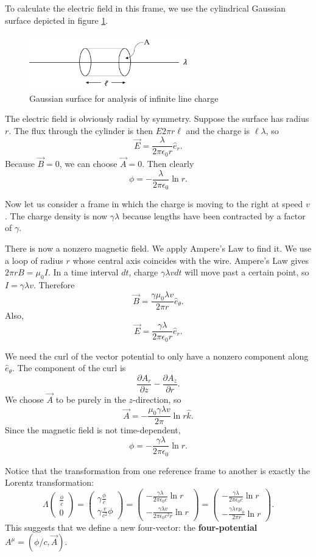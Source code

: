 To calculate the electric field in this frame, we use the cylindrical Gaussian surface depicted in figure \ref{1}.
\begin{figure}[ht]
\centering
\includegraphics[width=7cm]{images/relativity/surface.pdf}
\caption {Gaussian surface for analysis of infinite line charge}
 \label{1}
\end{figure} 
 The electric field is obviously radial by symmetry. Suppose the surface has radius $r$. The flux through the cylinder is then $E 2 \pi r \ell $ and the charge is $\ell \lambda$, so \[\vec{E} = \frac{\lambda}{2\pi\epsilon_0 r} \hat{e}_r. \]
Because $\vec{B} = 0$, we can choose $\vec{A} = 0$. Then clearly \[ \phi = -\frac{\lambda}{2\pi \epsilon_0} \ln r.\]

Now let us consider a frame in which the charge is moving to the right at speed $v$. The charge density is now $\gamma \lambda$ because lengths have been contracted by a factor of $\gamma$.

There is now a nonzero magnetic field. We apply Ampere's Law to find it. We use a loop of radius $r$ whose central axis coincides with the wire. Ampere's Law gives $2 \pi r B = \mu_0 I$. In a time interval $dt$, charge $\gamma \lambda v dt$ will move past a certain point, so $I = \gamma \lambda v$. Therefore \[\vec{B} = \frac{\gamma\mu_0\lambda v}{2\pi r} \hat{e}_\theta. \] 
Also, 
\[\vec{E} = \frac{\gamma \lambda}{2\pi\epsilon_0 r} \hat{e}_r. \]

We need the curl of the vector potential to only have a nonzero component along 
$\hat{e}_\theta$. The component of the curl is \[\frac{\partial A_r}{\partial z} - \frac{\partial A_z}{\partial r} .\] We choose $\vec{A}$ to be purely in the $z$-direction, so \[\vec{A} = -\frac{\mu_0 \gamma \lambda v}{2\pi} \ln r \hat{k} .\] Since the magnetic field is not time-dependent, 
\[\phi = -\frac{\gamma \lambda}{2\pi\epsilon_0} \ln r .\]

Notice that the transformation from one reference frame to another is exactly the Lorentz transformation:
\[
\Lambda \begin{pmatrix} \frac{\phi}{c} \\ 0 \end{pmatrix} = \begin{pmatrix}
\gamma \frac{\phi}{c} \\
\gamma \frac{v}{c^2} \phi 
\end{pmatrix} = \begin{pmatrix}
-\frac{\gamma \lambda}{2\pi\epsilon_0c} \ln r \\ -\frac{\gamma\lambda v}{2\pi \epsilon_0 c^2 r} \ln r
\end{pmatrix} = \begin{pmatrix}
-\frac{\gamma \lambda}{2\pi\epsilon_0c} \ln r \\ -\frac{\gamma\lambda v\mu_0}{2\pi  r} \ln r
\end{pmatrix}.
\]
This suggests that we define a new four-vector: the \textbf{four-potential} $A^\mu = (\phi/c, \vec{A}) $. 

